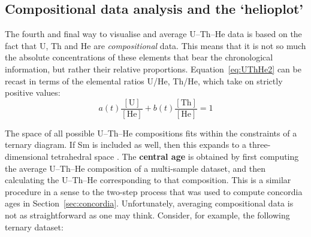 \begin{refsection}
\section{Compositional data analysis and the `helioplot'}

The fourth and final way to visualise and average U--Th--He data is
based on the fact that U, Th and He are \emph{compositional}
data. This means that it is not so much the absolute concentrations of
these elements that bear the chronological information, but rather
their relative proportions. Equation~\ref{eq:UThHe2} can be recast in
terms of the elemental ratios U/He, Th/He, which take on strictly
positive values:
\begin{equation}
  a(t) \frac{[\mbox{U}]}{[\mbox{He}]} +
  b(t) \frac{[\mbox{Th}]}{[\mbox{He}]} = 1
\end{equation}

The space of all possible U--Th--He compositions fits within the
constraints of a ternary diagram. If Sm is included as well, then this
expands to a three-dimensional tetrahedral space
\citep{vermeesch2008a}. The \textbf{central age} is obtained by first
computing the average U--Th--He composition of a multi-sample dataset,
and then calculating the U--Th--He corresponding to that composition.
This is a similar procedure in a sense to the two-step process that
was used to compute concordia ages in Section~\ref{sec:concordia}.
Unfortunately, averaging compositional data is not as straightforward
as one may think. Consider, for example, the following ternary
dataset:\\


\end{refsection}
